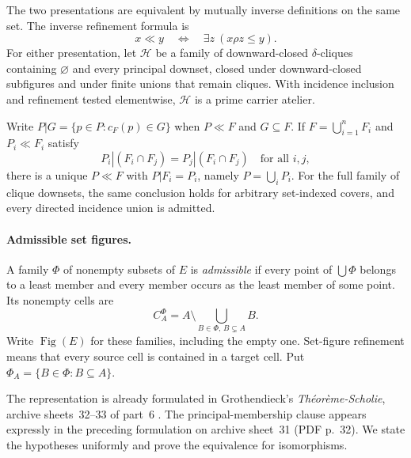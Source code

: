 \begin{theorem}
\label{thm:strong-relations}
The two presentations are equivalent by mutually inverse definitions
on the same set. The inverse refinement formula is
\[
 x\ll y\quad\Longleftrightarrow\quad
 \exists z\ (x\rho z\leq y).
\]
For either presentation, let $\mathscr H$ be a family of
downward-closed $\delta$-cliques containing $\varnothing$ and every principal downset,
closed under downward-closed subfigures and under finite unions
that remain cliques. With incidence inclusion and refinement tested
elementwise, $\mathscr H$ is a prime carrier atelier.

Write $P|G=\{p\in P:c_F(p)\in G\}$ when $P\ll F$ and
$G\subseteq F$. If $F=\bigcup_{i=1}^nF_i$ and
$P_i\ll F_i$ satisfy
\[
 P_i|(F_i\cap F_j)=P_j|(F_i\cap F_j)\quad\text{for all }i,j,
\]
there is a unique $P\ll F$ with $P|F_i=P_i$, namely
$P=\bigcup_iP_i$. For the full family of clique downsets,
the same conclusion holds for arbitrary set-indexed covers,
and every directed incidence union is admitted.
\end{theorem}



\paragraph{Admissible set figures.}
A family $\Phi$ of nonempty subsets of $E$ is \emph{admissible}
if every point of $\bigcup\Phi$ belongs to a least member and
every member occurs as the least member of some point.
Its nonempty cells are
\[
 C_A^\Phi=A\setminus\bigcup_{B\in\Phi,\,B\subsetneq A}B.
\]
Write $\operatorname{Fig}(E)$ for these families, including the
empty one. Set-figure refinement means that every source cell
is contained in a target cell. Put
$\Phi_A=\{B\in\Phi:B\subseteq A\}$.

The representation is already formulated in Grothendieck's
\emph{Th\'eor\`eme-Scholie}, archive sheets~32--33 of part~6
\cite[PDF pp.~33--34]{Groth6}. The principal-membership clause
appears expressly in the preceding formulation on archive sheet~31
(PDF p.~32). We state the hypotheses uniformly and prove the
equivalence for isomorphisms.

